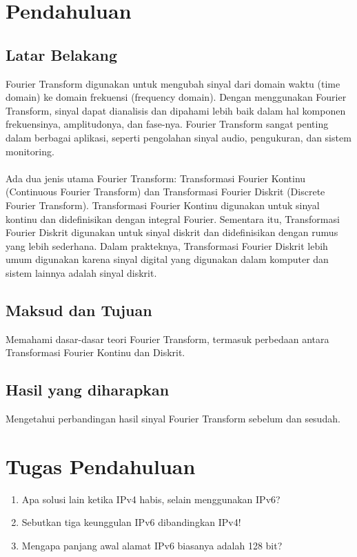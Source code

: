 \section{Pendahuluan}
\subsection{Latar Belakang}
Fourier Transform digunakan untuk mengubah sinyal dari domain waktu (time domain) ke domain frekuensi (frequency domain). 
Dengan menggunakan Fourier Transform, sinyal dapat dianalisis dan dipahami lebih baik dalam hal komponen frekuensinya, amplitudonya, dan fase-nya. 
Fourier Transform sangat penting dalam berbagai aplikasi, seperti pengolahan sinyal audio, pengukuran, dan sistem monitoring.
\\\\
Ada dua jenis utama Fourier Transform: Transformasi Fourier Kontinu (Continuous Fourier Transform) dan Transformasi Fourier Diskrit (Discrete Fourier Transform). 
Transformasi Fourier Kontinu digunakan untuk sinyal kontinu dan didefinisikan dengan integral Fourier. 
Sementara itu, Transformasi Fourier Diskrit digunakan untuk sinyal diskrit dan didefinisikan dengan rumus yang lebih sederhana. 
Dalam prakteknya, Transformasi Fourier Diskrit lebih umum digunakan karena sinyal digital yang digunakan dalam komputer dan sistem lainnya adalah sinyal diskrit.

\subsection{Maksud dan Tujuan}
Memahami dasar-dasar teori Fourier Transform, termasuk perbedaan antara Transformasi Fourier Kontinu dan Diskrit.

\subsection{Hasil yang diharapkan}
Mengetahui perbandingan hasil sinyal Fourier Transform sebelum dan sesudah.

\section{Tugas Pendahuluan}
\begin{center}
	\colorbox{cyan!30}{\parbox{0.8\linewidth}{
    \begin{enumerate}
        \item Apa solusi lain ketika IPv4 habis, selain menggunakan IPv6?
        \item Sebutkan tiga keunggulan IPv6 dibandingkan IPv4!
        \item Mengapa panjang awal alamat IPv6 biasanya adalah 128 bit?
    \end{enumerate}}}
\end{center}

